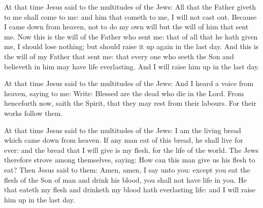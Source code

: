 \begin{multicols}{2}

At that time Jesus said to the multitudes of the Jews:
All that the Father giveth to me shall come to me: and him that
cometh to me, I will not cast out.
Because I came down from heaven, not to do my own will but the
will of him that sent me.
Now this is the will of the Father who sent me: that of all that
he hath given me, I should lose nothing; but should raise it up again in
the last day.
And this is the will of my Father that sent me: that every one who
seeth the Son and believeth in him may have life everlasting. And I will
raise him up in the last day.





At that time Jesus said to the multitudes of the Jews:
And I heard a voice from heaven, saying to me: Write: Blessed are
the dead who die in the Lord. From henceforth now, saith the Spirit,
that they may rest from their labours. For their works follow them.




At that time Jesus said to the multitudes of the Jews:
I am the living bread which came down from heaven.
If any man eat of this bread, he shall live for ever: and the
bread that I will give is my flesh, for the life of the world.
The Jews therefore strove among themselves, saying: How can this
man give us his flesh to eat?
Then Jesus said to them: Amen, amen, I say unto you: except you
eat the flesh of the Son of man and drink his blood, you shall not have
life in you.
He that eateth my flesh and drinketh my blood hath everlasting
life: and I will raise him up in the last day.




\bigskip




\end{multicols}
